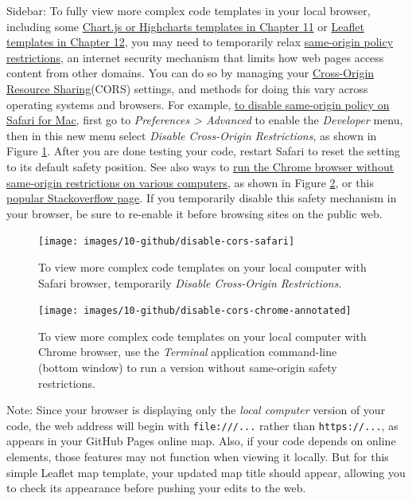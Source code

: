 \documentclass[
  english,
]{book}
\begin{document}
Sidebar: To fully view more complex code templates in your local browser, including some \href{chartcode.html}{Chart.js or Highcharts templates in Chapter 11} or \href{leaflet.html}{Leaflet templates in Chapter 12}, you may need to temporarily relax \href{https://en.wikipedia.org/wiki/Same-origin_policy}{same-origin policy restrictions}, an internet security mechanism that limits how web pages access content from other domains. You can do so by managing your \href{https://en.wikipedia.org/wiki/Cross-origin_resource_sharing}{Cross-Origin Resource Sharing}(CORS) settings, and methods for doing this vary across operating systems and browsers. For example, \href{https://stackoverflow.com/questions/4556429/disabling-same-origin-policy-in-safari}{to disable same-origin policy on Safari for Mac}, first go to \emph{Preferences \textgreater{} Advanced} to enable the \emph{Developer} menu, then in this new menu select \emph{Disable Cross-Origin Restrictions}, as shown in Figure \ref{fig:disable-cors-safari}. After you are done testing your code, restart Safari to reset the setting to its default safety position. See also ways to \href{https://alfilatov.com/posts/run-chrome-without-cors/}{run the Chrome browser without same-origin restrictions on various computers}, as shown in Figure \ref{fig:disable-cors-chrome}, or this \href{https://stackoverflow.com/questions/3102819/disable-same-origin-policy-in-chrome}{popular Stackoverflow page}. If you temporarily disable this safety mechanism in your browser, be sure to re-enable it before browsing sites on the public web.



\begin{figure}
\texttt{[image: images/10-github/disable-cors-safari]} \caption{To view more complex code templates on your local computer with Safari browser, temporarily \emph{Disable Cross-Origin Restrictions}.}\label{fig:disable-cors-safari}
\end{figure}



\begin{figure}
\texttt{[image: images/10-github/disable-cors-chrome-annotated]} \caption{To view more complex code templates on your local computer with Chrome browser, use the \emph{Terminal} application command-line (bottom window) to run a version without same-origin safety restrictions.}\label{fig:disable-cors-chrome}
\end{figure}

Note: Since your browser is displaying only the \emph{local computer} version of your code, the web address will begin with \texttt{file:///...} rather than \texttt{https://...}, as appears in your GitHub Pages online map. Also, if your code depends on online elements, those features may not function when viewing it locally. But for this simple Leaflet map template, your updated map title should appear, allowing you to check its appearance before pushing your edits to the web.
\end{document}
